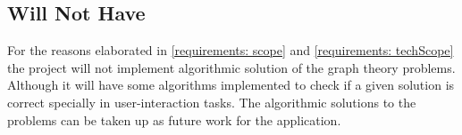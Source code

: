 \subsection{Will Not Have}
\label{requirements: willnothave}
For the reasons elaborated in \autoref{requirements: scope} and
\autoref{requirements: techScope} the project will not implement algorithmic
solution of the graph theory problems.  Although it will have some
algorithms implemented to check if a given solution is correct specially in
user-interaction tasks.  The algorithmic solutions to the problems can be taken
up as future work for the application.
